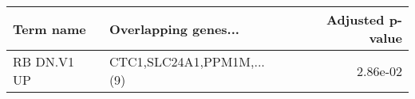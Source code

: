 \begin{tabular}{llr}
\toprule
  Term name &      Overlapping genes... &  Adjusted p-value \\
\midrule
RB DN.V1 UP & CTC1,SLC24A1,PPM1M,...(9) &          2.86e-02 \\
\bottomrule
\end{tabular}
